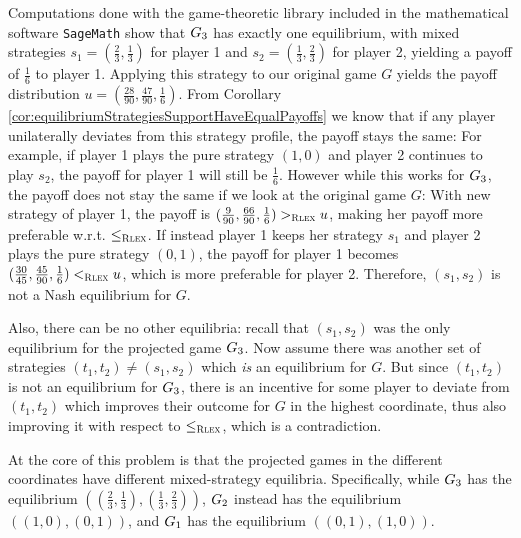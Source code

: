 \documentclass[a4paper]{scrreprt}
\begin{document}
    Computations done with the game-theoretic library included in the mathematical software \texttt{SageMath} %
    show that $G_{3}$ has exactly one equilibrium, with mixed strategies $s_1 = (\frac{2}{3}, \frac{1}{3})$ for player 1 and $s_2 = (\frac{1}{3}, \frac{2}{3})$ for player 2, yielding a payoff of $\frac{1}{6}$ to player 1.
    Applying this strategy to our original game $G$ yields the payoff distribution $u = (\frac{28}{90}, \frac{47}{90}, \frac{1}{6})$.
    From Corollary \ref{cor:equilibriumStrategiesSupportHaveEqualPayoffs} we know that if any player unilaterally deviates from this strategy profile, the payoff stays the same: 
    For example, if player 1 plays the pure strategy $(1, 0)$ and player 2 continues to play $s_2$, the payoff for player 1 will still be $\frac{1}{6}$.
    However while this works for $G_{3}$, the payoff does not stay the same if we look at the original game $G$:
    With new strategy of player 1, the payoff is $(\frac{9}{90}, \frac{66}{90}, \frac{1}{6}) >_{\textsc{Rlex}} u$, making her payoff more preferable w.r.t. $\leq_{\textsc{Rlex}}$.
    If instead player 1 keeps her strategy $s_1$ and player 2 plays the pure strategy $(0, 1)$, the payoff for player 1 becomes $(\frac{30}{45}, \frac{45}{90}, \frac{1}{6}) <_{\textsc{Rlex}} u$, which is more preferable for player 2.
    Therefore, $(s_1, s_2)$ is not a Nash equilibrium for $G$.
        
    Also, there can be no other equilibria: recall that $(s_1, s_2)$ was the only equilibrium for the projected game $G_{3}$. Now assume there was another set of strategies $(t_1, t_2) \neq (s_1, s_2)$ which \emph{is} an equilibrium for $G$. But since $(t_1, t_2)$ is not an equilibrium for $G_{3}$, there is an incentive for some player to deviate from $(t_1, t_2)$ which improves their outcome for $G$ in the highest coordinate, thus also improving it with respect to $\leq_{\textsc{Rlex}}$, which is a contradiction.
    
    At the core of this problem is that the projected games in the different coordinates have different mixed-strategy equilibria.
    Specifically, while $G_{3}$ has the equilibrium $((\frac{2}{3}, \frac{1}{3}), (\frac{1}{3}, \frac{2}{3}))$,
    $G_{2}$ instead has the equilibrium $((1, 0), (0, 1))$, and $G_{1}$ has the equilibrium $((0, 1), (1, 0))$.
    
\end{document}
